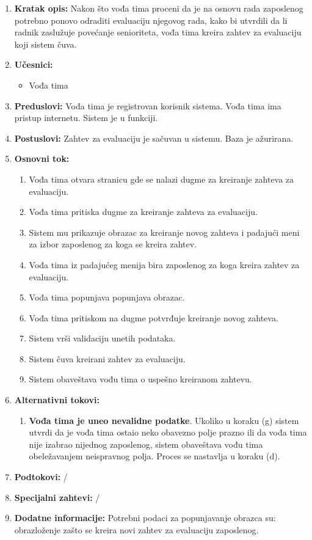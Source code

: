 \documentclass[a4paper]{article}
\begin{document}
\begin{enumerate}
    \item \textbf{Kratak opis:} Nakon što vođa tima proceni da je na osnovu rada zaposlenog potrebno ponovo odraditi evaluaciju njegovog rada, kako bi utvrdili da li radnik zaslužuje povećanje senioriteta, vođa tima kreira zahtev za evaluaciju koji sistem čuva.
    \item \textbf{Učesnici:}
        \begin{itemize}
            \item Vođa tima
        \end{itemize}
    \item \textbf{Preduslovi:} Vođa tima je registrovan korisnik sistema. Vođa tima ima pristup internetu. Sistem je u funkciji.
    \item \textbf{Postuslovi:} Zahtev za evaluaciju je sačuvan u sistemu. Baza je ažurirana.
    \item \textbf{Osnovni tok:}
        \begin{enumerate}
            \item Vođa tima otvara stranicu gde se nalazi dugme za kreiranje zahteva za evaluaciju.
            \item Vođa tima pritiska dugme za kreiranje zahteva za evaluaciju.
            \item Sistem mu prikazuje obrazac za kreiranje novog zahteva i padajući meni za izbor zaposlenog za koga se kreira zahtev.
            \item Vođa tima iz padajućeg menija bira zaposlenog za koga kreira zahtev za evaluaciju.
            \item Vođa tima popunjava popunjava obrazac.
            \item Vođa tima pritiskom na dugme potvrđuje kreiranje novog zahteva.
            \item Sistem vrši validaciju unetih podataka.
            \item Sistem čuva kreirani zahtev za evaluaciju.
            \item Sistem obaveštava vođu tima o uspešno kreiranom zahtevu.
        \end{enumerate}
    \item \textbf{Alternativni tokovi:}
        \begin{enumerate}
            \item \textbf{Vođa tima je uneo nevalidne podatke}. Ukoliko u koraku (g) sistem utvrdi da je vođa tima ostaio neko obavezno polje prazno ili da vođa tima nije izabrao nijednog zaposlenog, sistem obaveštava vođu tima obeležavanjem neispravnog polja. Proces se nastavlja u koraku (d).
        \end{enumerate}
    \item \textbf{Podtokovi:} /
    \item \textbf{Specijalni zahtevi:} /
    \item \textbf{Dodatne informacije:} Potrebni podaci za popunjavanje obrazca su: obrazloženje zašto se kreira novi zahtev za evaluaciju zaposlenog.
\end{enumerate}
\end{document}
